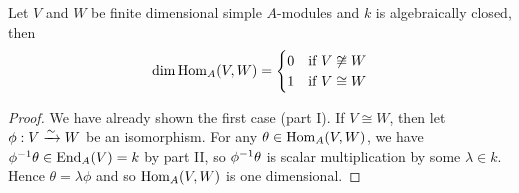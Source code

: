 \begin{thm}
	Let $V$ and $W$ be finite dimensional simple $A$-modules and $k$ is algebraically closed, then
	\[
		\dim \operatorname{Hom}_A(V,W)=
		\begin{cases}
			0 & \text{if } V \not\cong W \\
			1 & \text{if } V \cong W
		\end{cases}
	\]
\end{thm}

\begin{proof}
	We have already shown the first case (part I).
	If $V \cong W$, then let $\phi: V \xrightarrow{\sim} W$ be an isomorphism.
	For any $\theta \in \operatorname{Hom}_A(V,W)$, we have $\phi^{-1}\theta \in \operatorname{End}_A(V) = k$ by part II, so $\phi^{-1}\theta$ is scalar multiplication by some $\lambda \in k$.
	Hence $\theta=\lambda\phi$ and so $\operatorname{Hom}_A(V,W)$ is one dimensional.
\end{proof}